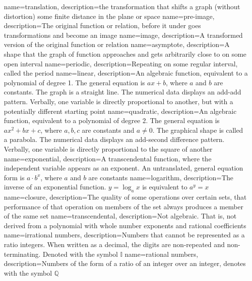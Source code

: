 {
	name={translation},
	description={the transformation that shifts a graph (without distortion) some finite distance in the plane or space}
}
{
	name={pre-image},
	description={The original function or relation, before it under goes transformations and become an image}
}
{
	name={image},
	description={A transformed version of the original function or relation}
}
{
	name={asymptote},
	description={A shape that the graph of function approaches and gets arbitrarily close to on some open interval}
}
{
	name={periodic},
	description={Repeating on some regular interval, called the period}
}
{
	name={linear},
	description={An algebraic function, equivalent to a polynomial of degree 1.  The general equation is $ax+b$, where $a$ and $b$ are constants.  The graph is a straight line.  The numerical data displays an add-add pattern.  Verbally, one variable is directly proportional to another, but with a potentially different starting point}
}
{
	name={quadratic},
	description={An algebraic function, equivalent to a polynomial of degree 2.  The general equation is $ax^2+bx+c$, where $a,b,c$ are constants and $a\ne0$.  The graphical shape is called a parabola.  The numerical data displays an add-second difference pattern.  Verbally, one variable is directly proportional to the square of another}
}
{
	name={exponential},
	description={A transcendental function, where the independent variable appears as an exponent.  An untranslated, general equation form is $a\cdot{}b^x$, where $a$ and $b$ are constants}
}
{
	name={logarithm},
	description={The inverse of an exponential function.  $y=\log_a{x}$ is equivalent to $a^y=x$}
}
{
	name={closure},
	description={The quality of some operations over certain sets, that performance of that operation on members of the set always produces a member of the same set}
}
{
	name={transcendental},
	description={Not algebraic.  That is, not derived from a polynomial with whole number exponents and rational coefficients}
}
{
	name={irrational numbers},
	description={Numbers that cannot be represented as a ratio integers.  When written as a decimal, the digits are non-repeated and non-terminating.  Denoted with the symbol $\mathbb{I}$}
}
{
	name={rational numbers},
	description={Numbers of the form of a ratio of an integer over an integer, denotes with the symbol $\mathbb{Q}$}
}
